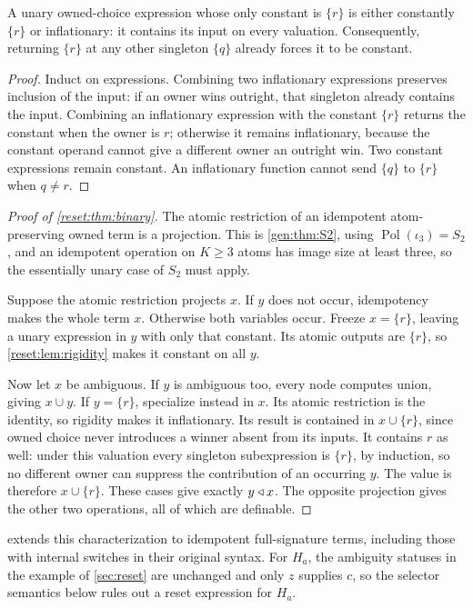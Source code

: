 \begin{lemma}\label{reset:lem:rigidity}
A unary owned-choice expression whose only constant is $\{r\}$ is
either constantly $\{r\}$ or inflationary: it contains its input on
every valuation. Consequently, returning $\{r\}$ at any other singleton
$\{q\}$ already forces it to be constant.
\end{lemma}
\begin{proof}
Induct on expressions. Combining two inflationary expressions preserves
inclusion of the input: if an owner wins outright, that singleton
already contains the input. Combining an inflationary expression with
the constant $\{r\}$ returns the constant when the owner is $r$;
otherwise it remains inflationary, because the constant operand cannot
give a different owner an outright win. Two constant expressions remain
constant. An inflationary function cannot send $\{q\}$ to $\{r\}$ when
$q\ne r$.
\end{proof}

\begin{proof}[Proof of \cref{reset:thm:binary}]
The atomic restriction of an idempotent atom-preserving owned term is
a projection. This is \cref{gen:thm:S2}, using $\operatorname{Pol}(\iota_3)=S_2$
\cite[Proposition~2.2]{Szendrei2012}, and an idempotent operation on
$K\geq3$ atoms has image size at least three, so the essentially unary
case of $S_2$ must apply.

Suppose the atomic restriction projects $x$. If $y$ does not occur,
idempotency makes the whole term $x$. Otherwise both variables occur.
Freeze $x=\{r\}$, leaving a unary expression in $y$ with only that
constant. Its atomic outputs are $\{r\}$, so
\cref{reset:lem:rigidity} makes it constant on all $y$.

Now let $x$ be ambiguous. If $y$ is ambiguous too, every node computes
union, giving $x\cup y$. If $y=\{r\}$, specialize instead in $x$.
Its atomic restriction is the identity, so rigidity makes it
inflationary. Its result is contained in $x\cup\{r\}$, since owned
choice never introduces a winner absent from its inputs. It contains
$r$ as well: under this valuation every singleton subexpression is
$\{r\}$, by induction, so no different owner can suppress the
contribution of an occurring $y$. The value is therefore
$x\cup\{r\}$. These cases give exactly $y\mathbin{\triangleleft} x$.
The opposite projection gives the other two operations, all of which
are definable.
\end{proof}

 extends this characterization to idempotent full-signature terms, including those with internal switches in their original syntax. For $H_a$, the ambiguity statuses in the example of \cref{sec:reset} are unchanged and only $z$ supplies $c$, so
the selector semantics below rules out a reset expression for $H_a$.

